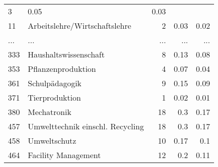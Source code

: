 \begin{longtable}{lXrrr}
          \num{3} &
          \num[round-mode=places,round-precision=2]{0,05} &
          \num[round-mode=places,round-precision=2]{0,03} \\
        11 & \multicolumn{1}{X}{Arbeitslehre/Wirtschaftslehre} & %
          \num{2} &
          \num[round-mode=places,round-precision=2]{0,03} &
          \num[round-mode=places,round-precision=2]{0,02} \\
       ... & ... & ... & ... & ... \\
        333 & \multicolumn{1}{X}{Haushaltswissenschaft} & %
          \num{8} &
          \num[round-mode=places,round-precision=2]{0,13} &
          \num[round-mode=places,round-precision=2]{0,08} \\

        353 & \multicolumn{1}{X}{Pflanzenproduktion} & %
          \num{4} &
          \num[round-mode=places,round-precision=2]{0,07} &
          \num[round-mode=places,round-precision=2]{0,04} \\

        361 & \multicolumn{1}{X}{Schulpädagogik} & %
          \num{9} &
          \num[round-mode=places,round-precision=2]{0,15} &
          \num[round-mode=places,round-precision=2]{0,09} \\

        371 & \multicolumn{1}{X}{Tierproduktion} & %
          \num{1} &
          \num[round-mode=places,round-precision=2]{0,02} &
          \num[round-mode=places,round-precision=2]{0,01} \\

        380 & \multicolumn{1}{X}{Mechatronik} & %
          \num{18} &
          \num[round-mode=places,round-precision=2]{0,3} &
          \num[round-mode=places,round-precision=2]{0,17} \\

        457 & \multicolumn{1}{X}{Umwelttechnik einschl. Recycling} & %
          \num{18} &
          \num[round-mode=places,round-precision=2]{0,3} &
          \num[round-mode=places,round-precision=2]{0,17} \\

        458 & \multicolumn{1}{X}{Umweltschutz} & %
          \num{10} &
          \num[round-mode=places,round-precision=2]{0,17} &
          \num[round-mode=places,round-precision=2]{0,1} \\

        464 & \multicolumn{1}{X}{Facility Management} & %
          \num{12} &
          \num[round-mode=places,round-precision=2]{0,2} &
          \num[round-mode=places,round-precision=2]{0,11} \\


\end{longtable}
